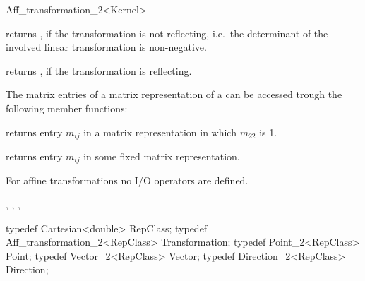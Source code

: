 \begin{ccRefClass}{Aff_transformation_2<Kernel>}

       {returns , if the transformation is not reflecting,
        i.e.\ the determinant of the involved linear transformation is
        non-negative.}

       {returns , if the transformation is reflecting.}



The matrix entries of a matrix representation of a 
can be accessed trough the following member functions:

                      {}
\ccGlue
{}
       {returns entry $m_{ij}$ in a matrix representation in which $m_{22}$ is 1.}

                      {}
\ccGlue
{}
       {returns entry $m_{ij}$ in some fixed matrix representation.} 


For affine transformations  no I/O operators are defined.

%

\ccSeeAlso
{}, 
, 
,
 \\

\ccExample

\begin{cprog}
  typedef Cartesian<double> RepClass;
  typedef Aff_transformation_2<RepClass> Transformation;
  typedef Point_2<RepClass> Point;
  typedef Vector_2<RepClass> Vector;
  typedef Direction_2<RepClass> Direction;


\end{cprog}
\end{ccRefClass}
